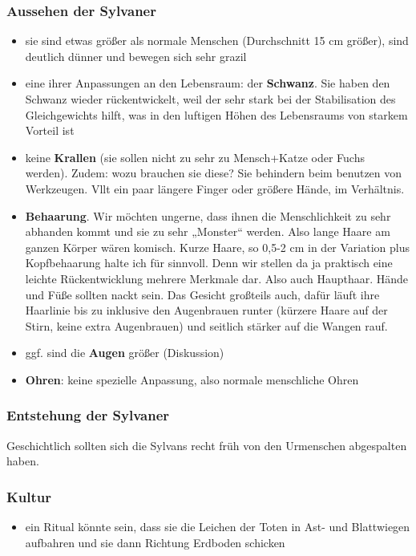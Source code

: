 \subsubsection{Aussehen der Sylvaner}
\begin{itemize}
	\item sie sind etwas größer als normale Menschen (Durchschnitt 15 cm größer), sind deutlich dünner und bewegen sich sehr grazil
	\item eine ihrer Anpassungen an den Lebensraum: der \textbf{Schwanz}. Sie haben den Schwanz wieder rückentwickelt, weil der sehr stark bei der Stabilisation des Gleichgewichts hilft, was in den luftigen Höhen des Lebensraums von starkem Vorteil ist
	\item keine \textbf{Krallen} (sie sollen nicht zu sehr zu Mensch+Katze oder Fuchs werden). Zudem: wozu brauchen sie diese? Sie behindern beim benutzen von Werkzeugen. Vllt ein paar längere Finger oder größere Hände, im Verhältnis. 
	\item \textbf{Behaarung}. Wir möchten ungerne, dass ihnen die Menschlichkeit zu sehr abhanden kommt und sie zu sehr „Monster“ werden. Also lange Haare am ganzen Körper wären komisch. Kurze Haare, so 0,5-2 cm in der Variation plus Kopfbehaarung halte ich für sinnvoll. Denn wir stellen da ja praktisch eine leichte Rückentwicklung mehrere Merkmale dar. Also auch Haupthaar. Hände und Füße sollten nackt sein. Das Gesicht großteils auch, dafür läuft ihre Haarlinie bis zu inklusive den Augenbrauen runter (kürzere Haare auf der Stirn, keine extra Augenbrauen) und seitlich stärker auf die Wangen rauf.
	\item ggf. sind die \textbf{Augen} größer (Diskussion)
	\item \textbf{Ohren}: keine spezielle Anpassung, also normale menschliche Ohren
\end{itemize}

\subsubsection{Entstehung der Sylvaner}
Geschichtlich sollten sich die Sylvans recht früh von den Urmenschen abgespalten haben.

\subsubsection{Kultur}
\begin{itemize}
	\item ein Ritual könnte sein, dass sie die Leichen der Toten in Ast- und Blattwiegen aufbahren und sie dann  Richtung Erdboden schicken
\end{itemize}

